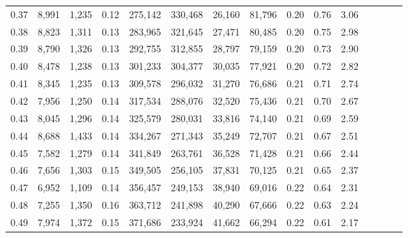 \begin{tabular}{rrrcrrrrrrrrrrr}
0.37 &   8,991 &   1,235 &                                       0.12 &  275,142 &  330,468 &   26,160 &   81,796 &  0.20 &  0.76 &                         3.06 \\
0.38 &   8,823 &   1,311 &                                       0.13 &  283,965 &  321,645 &   27,471 &   80,485 &  0.20 &  0.75 &                         2.98 \\
0.39 &   8,790 &   1,326 &                                       0.13 &  292,755 &  312,855 &   28,797 &   79,159 &  0.20 &  0.73 &                         2.90 \\
0.40 &   8,478 &   1,238 &                                       0.13 &  301,233 &  304,377 &   30,035 &   77,921 &  0.20 &  0.72 &                         2.82 \\
0.41 &   8,345 &   1,235 &                                       0.13 &  309,578 &  296,032 &   31,270 &   76,686 &  0.21 &  0.71 &                         2.74 \\
0.42 &   7,956 &   1,250 &                                       0.14 &  317,534 &  288,076 &   32,520 &   75,436 &  0.21 &  0.70 &                         2.67 \\
0.43 &   8,045 &   1,296 &                                       0.14 &  325,579 &  280,031 &   33,816 &   74,140 &  0.21 &  0.69 &                         2.59 \\
0.44 &   8,688 &   1,433 &                                       0.14 &  334,267 &  271,343 &   35,249 &   72,707 &  0.21 &  0.67 &                         2.51 \\
0.45 &   7,582 &   1,279 &                                       0.14 &  341,849 &  263,761 &   36,528 &   71,428 &  0.21 &  0.66 &                         2.44 \\
0.46 &   7,656 &   1,303 &                                       0.15 &  349,505 &  256,105 &   37,831 &   70,125 &  0.21 &  0.65 &                         2.37 \\
0.47 &   6,952 &   1,109 &                                       0.14 &  356,457 &  249,153 &   38,940 &   69,016 &  0.22 &  0.64 &                         2.31 \\
0.48 &   7,255 &   1,350 &                                       0.16 &  363,712 &  241,898 &   40,290 &   67,666 &  0.22 &  0.63 &                         2.24 \\
0.49 &   7,974 &   1,372 &                                       0.15 &  371,686 &  233,924 &   41,662 &   66,294 &  0.22 &  0.61 &                         2.17 \\

\end{tabular}
